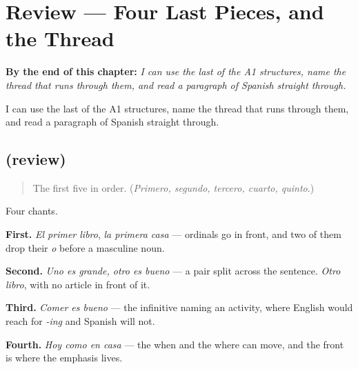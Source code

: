 
\chapter{Review --- Four Last Pieces, and the Thread}
\label{ch:repaso-a1}

\begin{chapteropening}
\textbf{By the end of this chapter:} \emph{I can use the last of the A1 structures, name the thread that runs through them, and read a paragraph of Spanish straight through.}

I can use the last of the A1 structures, name the thread that runs through them, and read a paragraph of Spanish straight through.
\end{chapteropening}

\section[(review)]{(review)}

\label{lesson:ES-C67-repaso-a1}



\begin{quote}
The first five in order. (\emph{Primero, segundo, tercero, cuarto, quinto}.)
\end{quote}

\begin{grammarlens}[title={What you've built}]
Four chants.

\textbf{First.} \emph{El primer libro}, \emph{la primera casa} — ordinals go in front, and two of them drop their \emph{o} before a masculine noun.

\textbf{Second.} \emph{Uno es grande, otro es bueno} — a pair split across the sentence. \emph{Otro libro}, with no article in front of it.

\textbf{Third.} \emph{Comer es bueno} — the infinitive naming an activity, where English would reach for \emph{-ing} and Spanish will not.

\textbf{Fourth.} \emph{Hoy como en casa} — the when and the where can move, and the front is where the emphasis lives.
\end{grammarlens}

